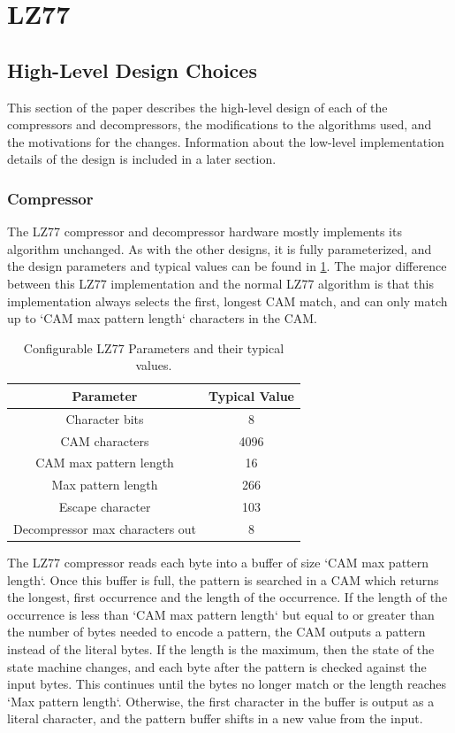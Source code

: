 \documentclass[doublespace,nopageskip]{VTthesis}
\begin{document}
\section{LZ77}\label{se:lz77}
\subsection{High-Level Design Choices}\label{se:lz77_design_choices}
This section of the paper describes the high-level design of each of the compressors and decompressors, the modifications to the algorithms used, and the motivations for the changes. Information about the low-level implementation details of the design is included in a later section.

\subsubsection{Compressor}\label{sss:lz77_compressor_design}
The LZ77 compressor and decompressor hardware mostly implements its algorithm unchanged. As with the other designs, it is fully parameterized, and the design parameters and typical values can be found in \ref{tab:lz77-configuration-table}. The major difference between this LZ77 implementation and the normal LZ77 algorithm is that this implementation always selects the first, longest CAM match, and can only match up to `CAM max pattern length` characters in the CAM.

\begin{table}[htb]
	\centering
	\caption{Configurable LZ77 Parameters and their typical values.}
	\begin{tabular}{cc}
	    \toprule
	    Parameter & Typical Value \\
	    \midrule
	    Character bits & 8 \\
	    \midrule
	    CAM characters & 4096 \\
	    \midrule
	    CAM max pattern length & 16 \\
	    \midrule
	    Max pattern length & 266 \\ 
	    \midrule
	    Escape character & 103 \\ 
	    \midrule
	    Decompressor max characters out & 8\\
	    \bottomrule
	\end{tabular}
	\label{tab:lz77-configuration-table}
\end{table}

The LZ77 compressor reads each byte into a buffer of size `CAM max pattern length`. Once this buffer is full, the pattern is searched in a CAM which returns the longest, first occurrence and the length of the occurrence. If the length of the occurrence is less than `CAM max pattern length` but equal to or greater than the number of bytes needed to encode a pattern, the CAM outputs a pattern instead of the literal bytes. If the length is the maximum, then the state of the state machine changes, and each byte after the pattern is checked against the input bytes. This continues until the bytes no longer match or the length reaches `Max pattern length`. Otherwise, the first character in the buffer is output as a literal character, and the pattern buffer shifts in a new value from the input.
\end{document}
